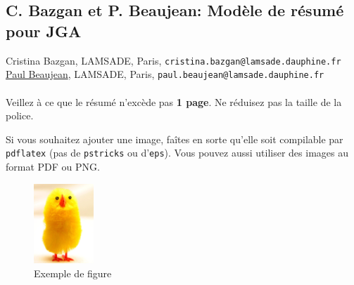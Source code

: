 \documentclass[a4paper,titlepage,12pt,normalheadings,makeidx]{article}
\begin{document}
\newpage

\subsection*{C. Bazgan et P. Beaujean: Modèle de résumé pour JGA}


Cristina Bazgan, LAMSADE, Paris,
\texttt{cristina.bazgan@lamsade.dauphine.fr}\\
\indent
\underline{Paul Beaujean}, LAMSADE, Paris,
\texttt{paul.beaujean@lamsade.dauphine.fr}\\
\\

Veillez à ce que le résumé n'excède pas {\bf 1 page}. Ne réduisez pas la taille
de la police.

Si vous souhaitez ajouter une image, faîtes en sorte qu'elle soit compilable
par \texttt{pdflatex} (pas de \texttt{pstricks} ou d'\texttt{eps}).
Vous pouvez aussi utiliser des images au format PDF ou PNG.

\begin{figure}[ht]
\begin{center}
\includegraphics[height=3cm]{../img/chick.png}
\caption{Exemple de figure \label{Fig:chick}}
\end{center}
\end{figure}
\vfill
\end{document}
